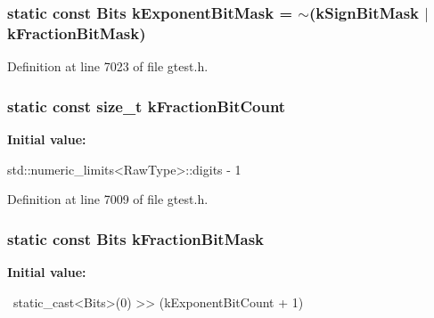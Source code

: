 \hypertarget{classtesting_1_1internal_1_1FloatingPoint_acf010cd7e66dd6299ba8a1a855b764b1}{
\subsubsection[{k\-Exponent\-Bit\-Mask}]{\setlength{\rightskip}{0pt plus 5cm}static const {\bf \-Bits} {\bf k\-Exponent\-Bit\-Mask} = $\sim$({\bf k\-Sign\-Bit\-Mask} $|$ {\bf k\-Fraction\-Bit\-Mask})}}\label{dd/d0f/classtesting_1_1internal_1_1FloatingPoint_acf010cd7e66dd6299ba8a1a855b764b1}


\-Definition at line 7023 of file gtest.\-h.

\hypertarget{classtesting_1_1internal_1_1FloatingPoint_a2f8f5292b5b12b0c0a73f8f2b0018b16}{
\subsubsection[{k\-Fraction\-Bit\-Count}]{\setlength{\rightskip}{0pt plus 5cm}static const size\-\_\-t {\bf k\-Fraction\-Bit\-Count}}}\label{dd/d0f/classtesting_1_1internal_1_1FloatingPoint_a2f8f5292b5b12b0c0a73f8f2b0018b16}
{\bfseries \-Initial value\-:}
\begin{DoxyCode}

    std::numeric_limits<RawType>::digits - 1
\end{DoxyCode}


\-Definition at line 7009 of file gtest.\-h.

\hypertarget{classtesting_1_1internal_1_1FloatingPoint_a269e9cd4be78c6bf94633c2d24387334}{
\subsubsection[{k\-Fraction\-Bit\-Mask}]{\setlength{\rightskip}{0pt plus 5cm}static const {\bf \-Bits} {\bf k\-Fraction\-Bit\-Mask}}}\label{dd/d0f/classtesting_1_1internal_1_1FloatingPoint_a269e9cd4be78c6bf94633c2d24387334}
{\bfseries \-Initial value\-:}
\begin{DoxyCode}

    ~static_cast<Bits>(0) >> (kExponentBitCount + 1)
\end{DoxyCode}


